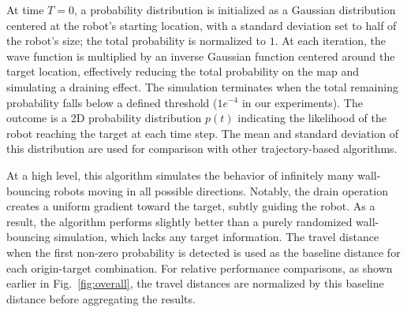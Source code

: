 At time $T = 0$, a probability distribution is initialized as a Gaussian distribution centered at the robot's starting location, with a standard deviation set to half of the robot's size; the total probability is normalized to $1$. At each iteration, the wave function is multiplied by an inverse Gaussian function centered around the target location, effectively reducing the total probability on the map and simulating a draining effect. The simulation terminates when the total remaining probability falls below a defined threshold ($1e^{-4}$ in our experiments). The outcome is a 2D probability distribution $p(t)$ indicating the likelihood of the robot reaching the target at each time step. The mean and standard deviation of this distribution are used for comparison with other trajectory-based algorithms.

At a high level, this algorithm simulates the behavior of infinitely many wall-bouncing robots moving in all possible directions. Notably, the drain operation creates a uniform gradient toward the target, subtly guiding the robot. As a result, the algorithm performs slightly better than a purely randomized wall-bouncing simulation, which lacks any target information. The travel distance when the first non-zero probability is detected is used as the baseline distance for each origin-target combination. For relative performance comparisons, as shown earlier in Fig.~\ref{fig:overall}, the travel distances are normalized by this baseline distance before aggregating the results.



